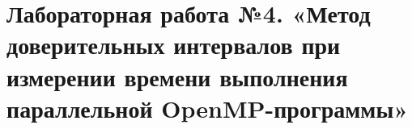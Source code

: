 \section{Лабораторная работа №4. «Метод доверительных интервалов при измерении времени выполнения параллельной OpenMP-программы»}





